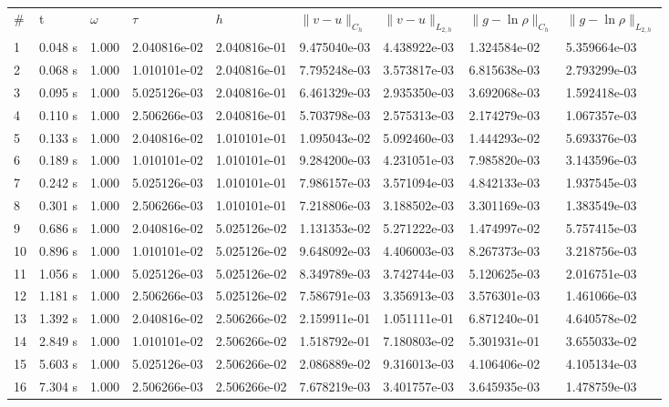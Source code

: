 \documentclass[12pt]{article}
\begin{document}
\begin{center}
\begin{tabular}{lllllllll}
\# & t & $\omega$ & $\tau$ & $h$ & $\|v - u\|_{C_h}$ & $\|v - u\|_{L_{2,h}}$ & $\|g - \ln\rho\|_{C_h}$ & $\|g - \ln\rho\|_{L_{2,h}}$ \\
1&      0.048 s&      1.000&      2.040816e-02&      2.040816e-01&      9.475040e-03&      4.438922e-03&      1.324584e-02&      5.359664e-03\\
2&      0.068 s&      1.000&      1.010101e-02&      2.040816e-01&      7.795248e-03&      3.573817e-03&      6.815638e-03&      2.793299e-03\\
3&      0.095 s&      1.000&      5.025126e-03&      2.040816e-01&      6.461329e-03&      2.935350e-03&      3.692068e-03&      1.592418e-03\\
4&      0.110 s&      1.000&      2.506266e-03&      2.040816e-01&      5.703798e-03&      2.575313e-03&      2.174279e-03&      1.067357e-03\\
5&      0.133 s&      1.000&      2.040816e-02&      1.010101e-01&      1.095043e-02&      5.092460e-03&      1.444293e-02&      5.693376e-03\\
6&      0.189 s&      1.000&      1.010101e-02&      1.010101e-01&      9.284200e-03&      4.231051e-03&      7.985820e-03&      3.143596e-03\\
7&      0.242 s&      1.000&      5.025126e-03&      1.010101e-01&      7.986157e-03&      3.571094e-03&      4.842133e-03&      1.937545e-03\\
8&      0.301 s&      1.000&      2.506266e-03&      1.010101e-01&      7.218806e-03&      3.188502e-03&      3.301169e-03&      1.383549e-03\\
9&      0.686 s&      1.000&      2.040816e-02&      5.025126e-02&      1.131353e-02&      5.271222e-03&      1.474997e-02&      5.757415e-03\\
10&      0.896 s&      1.000&      1.010101e-02&      5.025126e-02&      9.648092e-03&      4.406003e-03&      8.267373e-03&      3.218756e-03\\
11&      1.056 s&      1.000&      5.025126e-03&      5.025126e-02&      8.349789e-03&      3.742744e-03&      5.120625e-03&      2.016751e-03\\
12&      1.181 s&      1.000&      2.506266e-03&      5.025126e-02&      7.586791e-03&      3.356913e-03&      3.576301e-03&      1.461066e-03\\
13&      1.392 s&      1.000&      2.040816e-02&      2.506266e-02&      2.159911e-01&      1.051111e-01&      6.871240e-01&      4.640578e-02\\
14&      2.849 s&      1.000&      1.010101e-02&      2.506266e-02&      1.518792e-01&      7.180803e-02&      5.301931e-01&      3.655033e-02\\
15&      5.603 s&      1.000&      5.025126e-03&      2.506266e-02&      2.086889e-02&      9.316013e-03&      4.106406e-02&      4.105134e-03\\
16&      7.304 s&      1.000&      2.506266e-03&      2.506266e-02&      7.678219e-03&      3.401757e-03&      3.645935e-03&      1.478759e-03\\
\end{tabular}
\end{center}
\end{document}
